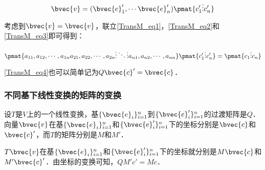 \begin{equation}\label{TransM_eq3}
\bvec{v}=(\bvec{e}'_1, \cdots\bvec{e}'_n)\pmat{c'_1\newline\vdots\newline c_n'}
\end{equation}

考虑到$\bvec{v}=\bvec{v}$，联立\autoref{TransM_eq1}，\autoref{TransM_eq2}和\autoref{TransM_eq3}即可得到：

\begin{equation}\label{TransM_eq4}
\pmat{a_{11},a_{12},\cdots,a_{1n}\newline a_{21},a_{22},\cdots,a_{2n}\newline\vdots\ddots\vdots\newline a_{n1},a_{n2},\cdots,a_{nn}}\pmat{c'_1\newline\vdots\newline c_n'}=\pmat{c_1\newline\vdots\newline c_n}
\end{equation}

\autoref{TransM_eq4}也可以简单记为$Q\bvec{c}'=\bvec{c}$．

\subsubsection{不同基下线性变换的矩阵的变换}


设$T$是$V$上的一个线性变换，基$\{\bvec{e}_i\}_{i=1}^{n}$到$\{\bvec{e}'_i\}_{i=1}^{n}$的过渡矩阵是$Q$．向量$\bvec{v}$在基$\{\bvec{e}_i\}_{i=1}^{n}$和$\{\bvec{e}'_i\}_{i=1}^{n}$下的坐标分别是$\bvec{c}$和$\bvec{c}'$，而$T$的矩阵分别是$M$和$M'$．

$T\bvec{v}$在基$\{\bvec{e}_i\}_{i=1}^{n}$和$\{\bvec{e}'_i\}_{i=1}^{n}$下的坐标就分别是$M\bvec{c}$和$M'\bvec{c}'$．由坐标的变换可知，$QM'c'=Mc$．